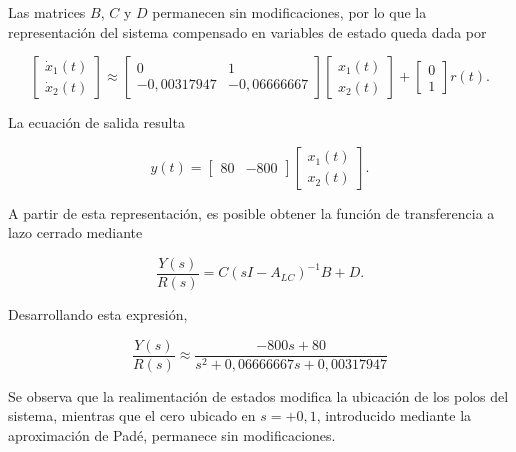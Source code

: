 \documentclass[10pt]{article}
\begin{document}
Las matrices $B$, $C$ y $D$ permanecen sin modificaciones,
por lo que la representación del sistema compensado
en variables de estado queda dada por

\begin{equation}
    \begin{bmatrix}
        \dot{x}_1(t)\\
        \dot{x}_2(t)
    \end{bmatrix}
    \approx
    \begin{bmatrix}
        0 & 1\\
        -0{,}00317947 & -0{,}06666667
    \end{bmatrix}
    \begin{bmatrix}
        x_1(t)\\
        x_2(t)
    \end{bmatrix}
    +
    \begin{bmatrix}
        0\\
        1
    \end{bmatrix}r(t).
\end{equation}

La ecuación de salida resulta

\begin{equation}
    y(t)=
    \begin{bmatrix}
        80 & -800
    \end{bmatrix}
    \begin{bmatrix}
        x_1(t)\\
        x_2(t)
    \end{bmatrix}.
\end{equation}

A partir de esta representación, es posible obtener
la función de transferencia a lazo cerrado mediante

\begin{equation}
    \frac{Y(s)}{R(s)}
    =C(sI-A_{LC})^{-1}B+D.
\end{equation}

Desarrollando esta expresión,

\begin{equation}
    \boxed{
        \frac{Y(s)}{R(s)}
        \approx
        \frac{-800s+80}
        {s^2+0{,}06666667s+0{,}00317947}
    }
    \label{eq:ej8_transferencia}
\end{equation}

Se observa que la realimentación de estados modifica
la ubicación de los polos del sistema, mientras que
el cero ubicado en $s=+0{,}1$, introducido mediante
la aproximación de Padé, permanece sin modificaciones.
\end{document}
